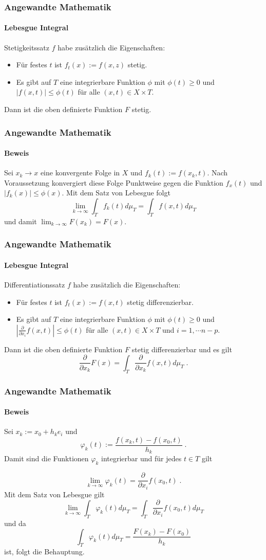 \documentclass{beamer}
\begin{document}
\begin{frame}
    \frametitle{Angewandte Mathematik}
\framesubtitle{Lebesgue Integral}
\begin{block}{Stetigkeitssatz}
$f$ habe zusätzlich die Eigenschaften:
\begin{itemize}
\item Für festes $t$ ist $f_t(x):= f(x,z)$ stetig.
\item Es gibt auf $T$ eine integrierbare Funktion $\phi$ mit $\phi(t) \geq 0$ und $|f(x,t)| \leq \phi(t)$ für alle $(x,t) \in X \times T$.
\end{itemize}
Dann ist die oben definierte Funktion $F$ stetig. 
\end{block}
 \end{frame}


\begin{frame}
    \frametitle{Angewandte Mathematik}
\framesubtitle{Beweis}
Sei  $x_k \to x$   eine konvergente Folge in $X$ und $f_k(t):= f(x_k,t)$. Nach Voraussetzung konvergiert diese Folge Punktweise gegen die Funktion $f_x(t)$ und $| f_k (x) | \leq \phi(x)$. Mit dem Satz von Lebesgue folgt
$$ \lim_{k \to \infty} \int_T f_k(t) d \mu_T = \int_T f(x,t) d \mu_T$$
und damit $ \lim_{k \to \infty} F(x_k) =  F(x)$.
 \end{frame}

\begin{frame}
    \frametitle{Angewandte Mathematik}
\framesubtitle{Lebesgue Integral}
\begin{block}{Differentiationssatz}
$f$ habe zusätzlich die Eigenschaften:
\begin{itemize}
\item Für festes $t$ ist $f_t(x):= f(x,t)$ stetig differenzierbar.
\item Es gibt auf $T$ eine integrierbare Funktion $\phi$ mit $\phi(t) \geq 0$ und $| \frac{\partial}{\partial x_i} f(x,t)| \leq \phi(t)$ für alle $(x,t) \in X \times T$ und $i=1, \cdots n-p$.
\end{itemize}
Dann ist die oben definierte Funktion $F$ stetig differenzierbar und es gilt
$$\frac{\partial}{\partial x_k} F(x)  = \int_T \frac{\partial}{\partial x_k} f(x,t) d \mu_T \; .$$ 
\end{block}
 \end{frame}

\begin{frame}
    \frametitle{Angewandte Mathematik}
\framesubtitle{Beweis}
Sei $x_k := x_0 + h_k e_i$ und 
$$ \varphi_k (t) := \frac{f(x_k,t)  - f(x_0,t)  }{h_k} \; .$$
Damit sind die Funktionen  $\varphi_k $ integrierbar und für jedes $t \in T$ gilt

$$  \lim_{k \to \infty} \varphi_k (t) = \frac{\partial}{\partial x_i}f(x_0, t) \; .$$
Mit dem Satz von Lebesgue gilt
$$ \lim_{k \to \infty}  \int_T \varphi_k (t) d \mu_T = \int_T   \frac{\partial}{\partial x_i}f(x_0, t) d \mu_T $$
und da 
$$  \int_T \varphi_k (t) d \mu_T = \frac{F(x_k) -F(x_0)}{h_k}$$ ist, folgt die Behauptung.
 \end{frame}
\end{document}
